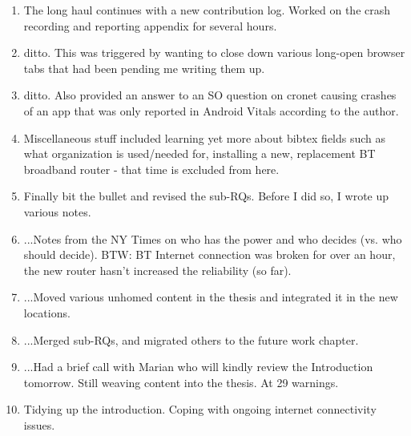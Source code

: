 \begin{enumerate}
    \item The long haul continues with a new contribution log. Worked on the crash recording and reporting appendix for several hours.
    \item ditto. This was triggered by wanting to close down various long-open browser tabs that had been pending me writing them up.
    \item ditto. Also provided an answer to an SO question on cronet causing crashes of an app that was only reported in Android Vitals according to the author.
    \item Miscellaneous stuff included learning yet more about bibtex fields such as what organization is used/needed for, installing a new, replacement BT broadband router - that time is excluded from here.
    \item Finally bit the bullet and revised the sub-RQs. Before I did so, I wrote up various notes.
    \item ...Notes from the NY Times on who has the power and who decides (vs. who should decide). BTW: BT Internet connection was broken for over an hour, the new router hasn't increased the reliability (so far).
    \item ...Moved various unhomed content in the thesis and integrated it in the new locations.
    \item ...Merged sub-RQs, and migrated others to the future work chapter.
    \item ...Had a brief call with Marian who will kindly review the Introduction tomorrow. Still weaving content into the thesis. At 29 warnings.
    \item Tidying up the introduction. Coping with ongoing internet connectivity issues.
\end{enumerate}